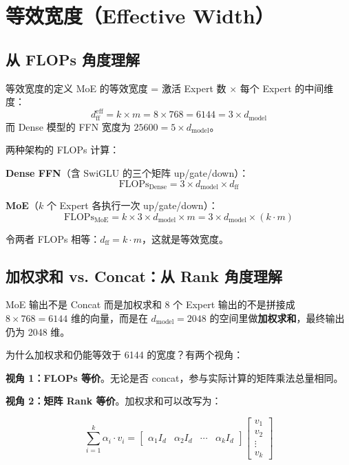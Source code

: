 \section{等效宽度（Effective Width）}

\subsection{从 FLOPs 角度理解}

\begin{importantbox}{等效宽度的定义}
MoE 的等效宽度 = 激活 Expert 数 $\times$ 每个 Expert 的中间维度：
$$
d_{\text{ff}}^{\text{eff}} = k \times m = 8 \times 768 = 6144 = 3 \times d_{\text{model}}
$$
而 Dense 模型的 FFN 宽度为 $25600 = 5 \times d_{\text{model}}$。
\end{importantbox}

两种架构的 FLOPs 计算：

\textbf{Dense FFN}（含 SwiGLU 的三个矩阵 up/gate/down）：
$$
\text{FLOPs}_{\text{Dense}} = 3 \times d_{\text{model}} \times d_{\text{ff}}
$$

\textbf{MoE}（$k$ 个 Expert 各执行一次 up/gate/down）：
$$
\text{FLOPs}_{\text{MoE}} = k \times 3 \times d_{\text{model}} \times m = 3 \times d_{\text{model}} \times (k \cdot m)
$$

令两者 FLOPs 相等：$d_{\text{ff}} = k \cdot m$，这就是等效宽度。

\subsection{加权求和 vs. Concat：从 Rank 角度理解}

\begin{warningbox}{MoE 输出不是 Concat 而是加权求和}
8 个 Expert 输出的不是拼接成 $8 \times 768 = 6144$ 维的向量，而是在 $d_{\text{model}} = 2048$ 的空间里做\textbf{加权求和}，最终输出仍为 2048 维。
\end{warningbox}

为什么加权求和仍能等效于 6144 的宽度？有两个视角：

\textbf{视角 1：FLOPs 等价}。无论是否 concat，参与实际计算的矩阵乘法总量相同。

\textbf{视角 2：矩阵 Rank 等价}。加权求和可以改写为：

$$
\sum_{i=1}^{k} \alpha_i \cdot v_i = \begin{bmatrix} \alpha_1 I_d & \alpha_2 I_d & \cdots & \alpha_k I_d \end{bmatrix} \begin{bmatrix} v_1 \\ v_2 \\ \vdots \\ v_k \end{bmatrix}
$$

